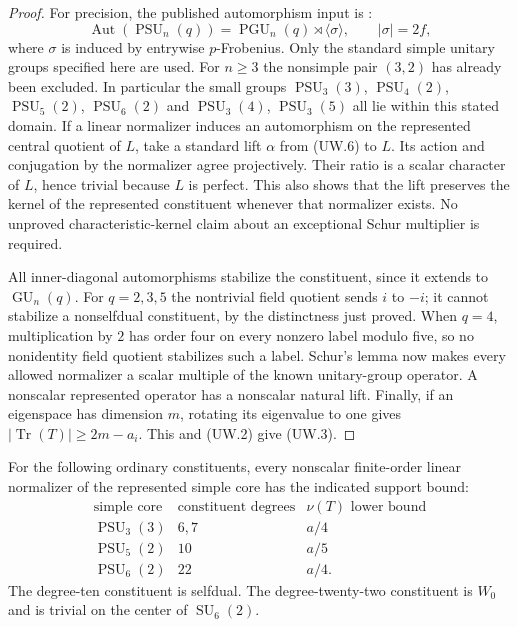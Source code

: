 \begin{proof}
For precision, the published automorphism input is
\cite[\S2.2, Lemma6, p.~114]{BI:YangWuRevinVdovin2023}:
\[
 \operatorname{Aut}(\operatorname{PSU}_n(q))
      =\operatorname{PGU}_n(q)\rtimes\langle\sigma\rangle,
 \qquad |\sigma|=2f,                                       \tag{UW.6}
\]
where $\sigma$ is induced by entrywise $p$-Frobenius.
Only the standard simple unitary groups specified here are used.
For $n\ge3$ the nonsimple pair $(3,2)$ has already been excluded.
In particular the small groups $\operatorname{PSU}_3(3)$,
$\operatorname{PSU}_4(2)$, $\operatorname{PSU}_5(2)$,
$\operatorname{PSU}_6(2)$ and $\operatorname{PSU}_3(4)$,
$\operatorname{PSU}_3(5)$ all lie within this stated domain.
If a linear normalizer induces an automorphism on the represented
central quotient of $L$, take a standard lift $\alpha$ from
(UW.6) to $L$. Its action and conjugation by the normalizer agree
projectively. Their ratio is a scalar character of $L$, hence
trivial because $L$ is perfect. This also shows that the lift
preserves the kernel of the represented constituent whenever
that normalizer exists. No unproved characteristic-kernel claim
about an exceptional Schur multiplier is required.

All inner-diagonal automorphisms stabilize the constituent,
since it extends to $\operatorname{GU}_n(q)$. For $q=2,3,5$
the nontrivial field quotient sends $i$ to $-i$; it cannot
stabilize a nonselfdual constituent, by the distinctness just
proved. When $q=4$, multiplication by $2$ has order four on
every nonzero label modulo five, so no nonidentity field
quotient stabilizes such a label. Schur's lemma now makes
every allowed normalizer a scalar multiple of the known
unitary-group operator. A nonscalar represented operator
has a nonscalar natural lift. Finally, if an eigenspace has
dimension $m$, rotating its eigenvalue to one gives
$|\operatorname{Tr}(T)|\ge2m-a_i$. This and (UW.2) give (UW.3).
\end{proof}

\begin{lemma}
\label{D-BI-24b}
For the following ordinary constituents, every nonscalar
finite-order linear normalizer of the represented simple
core has the indicated support bound:
\[
\begin{array}{c|c|c}
\text{simple core}&\text{constituent degrees}&\nu(T)\text{ lower bound}\\\hline
\operatorname{PSU}_3(3)&6,7&a/4\\
\operatorname{PSU}_5(2)&10&a/5\\
\operatorname{PSU}_6(2)&22&a/4.
\end{array}                                                  \tag{UW.7}
\]
The degree-ten constituent is selfdual. The degree-twenty-two
constituent is $W_0$ and is trivial on the center of
$\operatorname{SU}_6(2)$.
\end{lemma}

